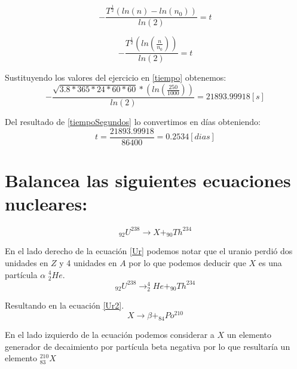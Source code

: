 \documentclass[]{article}
\begin{document}
\begin{equation}
-\frac{T^{\frac{1}{2}}(ln(n)-ln(n_0))}{ln(2)}=t
\end{equation}


\begin{equation}
-\frac{T^{\frac{1}{2}}(ln(\frac{n}{n_0}))}{ln(2)}=t
\label{tiempo}
\end{equation}

Sustituyendo los valores del ejercicio en \ref{tiempo} obtenemos:\\


\begin{equation}
-\frac{\sqrt{3.8*365*24*60*60}*(ln(\frac{250}{1000}))}{ln(2)}=21893.99918[s]
\label{tiempoSegundos}
\end{equation}

Del resultado de \ref{tiempoSegundos} lo convertimos en días obteniendo:\\

\begin{equation}
 t=\frac{21893.99918}{86400}=0.2534 [dias] 
\end{equation}







\section{Balancea las siguientes ecuaciones nucleares:}

\begin{equation}
   _{92}U^{238} \to X + _{90}Th^{234}
   \label{Ur}
\end{equation}

En el lado derecho de la ecuación \ref{Ur} podemos notar que el uranio perdió dos unidades en $Z$ y 4 unidades en $A$ por lo que podemos deducir que $X$ es una partícula $\alpha$ $_2^4He$.\\

\begin{equation}
   _{92}U^{238} \to _2^4He + _{90}Th^{234}
   \label{Ur2}
\end{equation}

Resultando en la ecuación \ref{Ur2}.\\

\begin{equation}
   X \to \beta + _{84}Po^{210}   
   \label{Po}
\end{equation}

En el lado izquierdo de la ecuación podemos considerar a $X$ un elemento generador de decaimiento por partícula beta negativa por lo que resultaría un elemento $_{83}^{210}X$ 
\end{document}
